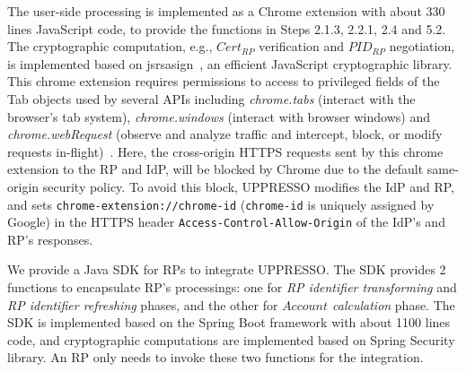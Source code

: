The user-side processing is implemented as a Chrome extension with about 330 lines JavaScript code, to provide the functions in Steps 2.1.3, 2.2.1, 2.4 and 5.2.
The cryptographic computation, e.g., $Cert_{RP}$ verification and $PID_{RP}$ negotiation, is implemented based on jsrsasign~\cite{jsrsasign}, an efficient JavaScript cryptographic library.
This chrome extension requires permissions to access to privileged fields of the Tab objects used by several APIs including \emph{chrome.tabs} (interact with the browser's tab system), \emph{chrome.windows} (interact with browser windows) and \emph{chrome.webRequest} (observe and analyze traffic and intercept, block, or modify requests in-flight)~\cite{chromeExtension}.
Here, the cross-origin HTTPS requests sent by this chrome extension to the RP and IdP, will be blocked by Chrome due to the default same-origin security policy.
To avoid this block, UPPRESSO modifies the IdP and RP, and sets \verb+chrome-extension://chrome-id+ (\verb+chrome-id+ is uniquely assigned by Google) in the HTTPS header \verb+Access-Control-Allow-Origin+ of the IdP's and RP's responses.

We provide a Java SDK for RPs to integrate UPPRESSO.
The SDK provides 2 functions to encapsulate RP's processings: one for  \emph{RP identifier transforming} and \emph{RP identifier refreshing} phases, and the other for \emph{$Account$ calculation} phase. %
The SDK is implemented based on the Spring Boot framework  with about 1100 lines code, and cryptographic computations are implemented based on Spring Security library.
An RP only needs to invoke these two functions for the integration.


